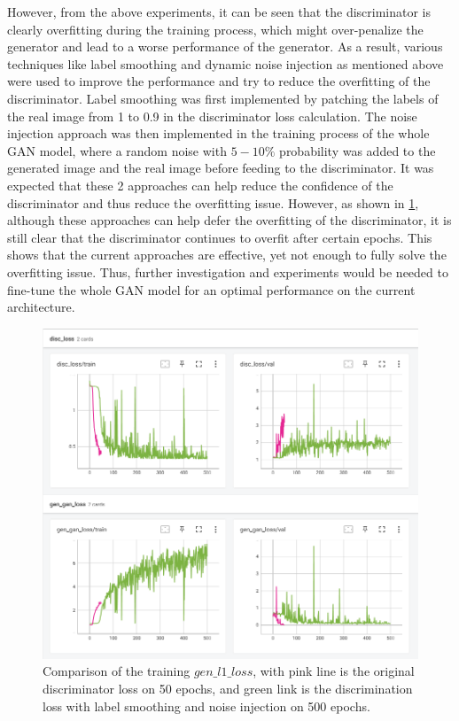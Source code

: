 \documentclass[10pt,twocolumn,letterpaper]{article}
\begin{document}
However, from the above experiments, it can be seen that the discriminator is clearly overfitting during the training process, which might over-penalize the generator and lead to a worse performance of the 
generator. As a result, various techniques like label smoothing and dynamic noise injection as mentioned above were used to improve the performance and try to reduce the overfitting of the discriminator. 
Label smoothing was first implemented by patching the labels of the real image from 1 to 0.9 in the discriminator loss calculation. The noise injection approach was then implemented in the training process of the 
whole GAN model, where a random noise with $5-10\%$ probability was added to the generated image and the real image before feeding to the discriminator. It was expected that these 2 approaches can help reduce the 
confidence of the discriminator and thus reduce the overfitting issue. However, as shown in \cref{fig:smooth_with_noise}, although these approaches can help defer the overfitting of the discriminator, it is still 
clear that the discriminator continues to overfit after certain epochs. This shows that the current approaches are effective, yet not enough to fully solve the overfitting issue. Thus, further investigation and 
experiments would be needed to fine-tune the whole GAN model for an optimal performance on the current architecture.

\begin{figure}[t]
    \centering
    \includegraphics[width=\linewidth]{figures/milestone/smooth_with_noise.png}
    \caption{Comparison of the training $gen\_l1\_loss$, with pink line is the original discriminator loss on 50 epochs, and green link is the discrimination loss with label smoothing and noise injection on 500 epochs.}
    \label{fig:smooth_with_noise}
\end{figure}
\end{document}
